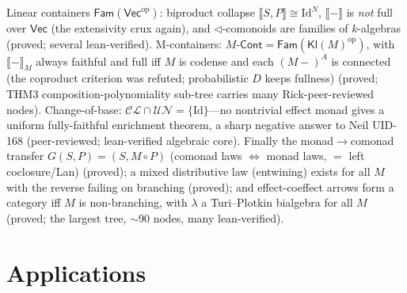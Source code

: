 \documentclass[11pt]{article}
\theoremstyle{definition}
\newcommand{\Cont}{\mathsf{Cont}}
\newcommand{\Vect}{\mathsf{Vec}}
\newcommand{\Fam}{\mathsf{Fam}}
\newcommand{\Kl}{\mathsf{Kl}}
\newcommand{\sem}[1]{\llbracket #1 \rrbracket}
\newcommand{\grade}[1]{{\small\textsf{(#1)}}}
\begin{document}
Linear containers $\Fam(\Vect^{\mathrm{op}})$: biproduct collapse $\sem{S,P} \cong
\mathrm{Id}^N$, $\sem{-}$ is \emph{not} full over $\Vect$ (the extensivity crux again), and
$\lhd$-comonoids are families of $k$-algebras \grade{proved; several lean-verified}. M-containers:
$M\text{-}\Cont = \Fam(\Kl(M)^{\mathrm{op}})$, with $\sem{-}_M$ always faithful and full iff $M$
is codense and each $(M-)^A$ is connected (the coproduct criterion was refuted; probabilistic $D$
keeps fullness) \grade{proved; THM3 composition-polynomiality sub-tree carries many
Rick-peer-reviewed nodes}. Change-of-base: $\mathcal{CL}\cap\mathcal{UN} = \{\mathrm{Id}\}$---no
nontrivial effect monad gives a uniform fully-faithful enrichment theorem, a sharp negative answer
to Neil UID-168 \grade{peer-reviewed; lean-verified algebraic core}. Finally the monad$\to$comonad
transfer $G(S,P) = (S,M\circ P)$ (comonad laws $\Leftrightarrow$ monad laws, $=$ left
coclosure/Lan) \grade{proved}; a mixed distributive law (entwining) exists for all $M$ with the
reverse failing on branching \grade{proved}; and effect-coeffect arrows form a category iff $M$ is
non-branching, with $\lambda$ a Turi--Plotkin bialgebra for all $M$ \grade{proved; the largest tree,
$\sim$90 nodes, many lean-verified}.

\section{Applications}
\label{sec:apps}
\end{document}
